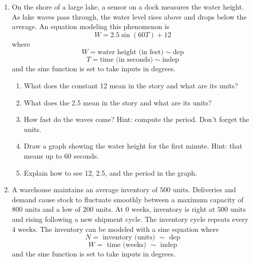 \begin{enumerate}
\begin{enumerate}
    \item Use the equation to calculate the volunteer participation at $M=0$, $M=3$, $M=6$, $M=9$, and $M=12$.
    \item According to the graph, what's the highest level of volunteer participation and in what month does that occur? 
    \item Use your equation to determine the highest level of volunteer participation.
    \item According to the graph, what's the lowest level of volunteer participation and in what month does that occur?
    \item Use your equation to determine the lowest level of volunteer participation.
    \item According to the graph, what is the average number of volunteer hours?
    \item Use your equation to determine the average level of volunteer participation.
\end{enumerate}


\item On the shore of a large lake, a sensor on a dock measures the water height. As lake waves pass through, the water level rises above and drops below the average. An equation modeling this phenomenon is
$$ W = 2.5 \sin(60T) + 12 $$
where
$$ W = \text{water height (in feet)} \sim \text{dep} $$
$$ T = \text{time (in seconds)} \sim \text{indep} $$
and the sine function is set to take inputs in degrees.
\begin{enumerate}
    \item What does the constant 12 mean in the story and what are its units?
    \item What does the 2.5 mean in the story and what are its units?
    \item How fast do the waves come? Hint: compute the period. Don't forget the units.
    \item Draw a graph showing the water height for the first minute. Hint: that means up to 60 seconds.
    \item Explain how to see 12, 2.5, and the period in the graph.
\end{enumerate}

\item A warehouse maintains an average inventory of $500\text{ units}$. Deliveries and demand cause stock to fluctuate smoothly between a maximum capacity of $800\text{ units}$ and a low of $200\text{ units}$. At $0\text{ weeks}$, inventory is right at $500\text{ units}$ and rising following a new shipment cycle. The inventory cycle repeats every $4\text{ weeks}$.  The inventory can be modeled with a sine equation where
$$N = \text{ inventory (units) } \sim \text{ dep}$$
$$W = \text{ time (weeks) } \sim \text{ indep}$$
and the sine function is set to take inputs in degrees.


\end{enumerate}
